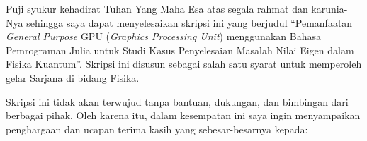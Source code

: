 \documentclass{skripsiactugm}
\begin{document}
\cover


\approvalpagescan
\declarepagescan




\preface

Puji syukur kehadirat Tuhan Yang Maha Esa atas segala rahmat dan karunia-Nya sehingga saya dapat menyelesaikan skripsi ini yang berjudul “Pemanfaatan \emph{General Purpose} GPU (\emph{Graphics Processing Unit}) menggunakan Bahasa Pemrograman Julia untuk Studi Kasus Penyelesaian Masalah Nilai Eigen dalam Fisika Kuantum”. Skripsi ini disusun sebagai salah satu syarat untuk memperoleh gelar Sarjana di bidang Fisika.

Skripsi ini tidak akan terwujud tanpa bantuan, dukungan, dan bimbingan dari berbagai pihak. Oleh karena itu, dalam kesempatan ini saya ingin menyampaikan penghargaan dan ucapan terima kasih yang sebesar-besarnya kepada:
\end{document}
